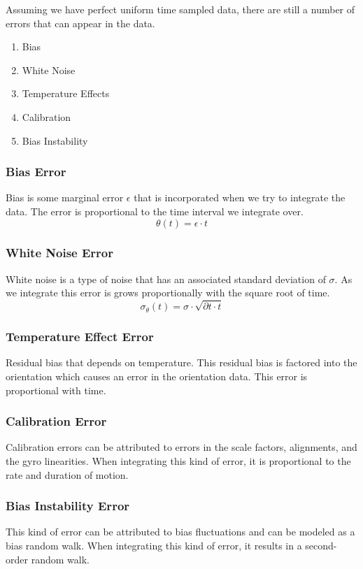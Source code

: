\documentclass[10pt]{beamer}
\begin{document}
\begin{frame}
Assuming we have perfect uniform time sampled data, there are still a number of errors that can appear in the data.
\begin{enumerate}
\item Bias
\item White Noise
\item Temperature Effects
\item Calibration
\item Bias Instability
\end{enumerate}
\end{frame}

\begin{frame}
\frametitle{Bias Error}
Bias is some marginal error $\epsilon$ that is incorporated when we try to integrate the data. The error is proportional to the time interval we integrate over.
\begin{equation*}
\theta(t) = \epsilon \cdot t
\end{equation*}
\end{frame}

\begin{frame}
\frametitle{White Noise Error}
White noise is a type of noise that has an associated standard deviation of $\sigma$. As we integrate this error is grows proportionally with the square root of time. 
\begin{equation*}
\sigma_{\theta}(t) = \sigma \cdot \sqrt{\partial t \cdot t}
\end{equation*}
\end{frame}

\begin{frame}
\frametitle{Temperature Effect Error}
Residual bias that depends on temperature. This residual bias is factored into the orientation which causes an error in the orientation data. This error is proportional with time.
\end{frame}

\begin{frame}
\frametitle{Calibration Error}
Calibration errors can be attributed to errors in the scale factors, alignments, and the gyro linearities. When integrating this kind of error, it is proportional to the rate and duration of motion.
\end{frame}

\begin{frame}
\frametitle{Bias Instability Error}
This kind of error can be attributed to bias fluctuations and can be modeled as a bias random walk. When integrating this kind of error, it results in a second-order random walk.  
\end{frame}
\end{document}
